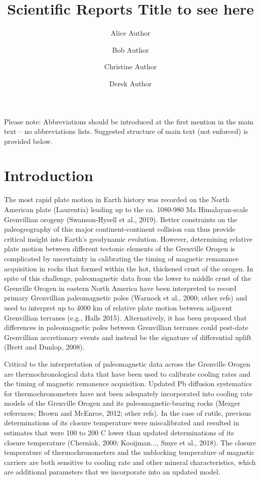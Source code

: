 \documentclass[fleqn,10pt]{wlscirep}
\title{Scientific Reports Title to see here}
\author[1,*]{Alice Author}
\author[2]{Bob Author}
\author[1,2,+]{Christine Author}
\author[2,+]{Derek Author}
\affil[1]{Affiliation, department, city, postcode, country}
\affil[2]{Affiliation, department, city, postcode, country}
\affil[*]{corresponding.author@email.example}
\affil[+]{these authors contributed equally to this work}
\begin{document}
\flushbottom
\maketitle
%
%
\thispagestyle{empty}

\noindent Please note: Abbreviations should be introduced at the first mention in the main text – no abbreviations lists. Suggested structure of main text (not enforced) is provided below.

\section*{Introduction}

The most rapid plate motion in Earth history was recorded on the North American plate (Laurentia) leading up to the ca. 1080-980 Ma Himalayan-scale Grenvillian orogeny (Swanson-Hysell et al., 2019). Better constraints on the paleogeography of this major continent-continent collision can thus provide critical insight into Earth's geodynamic evolution. However, determining relative plate motion between different tectonic elements of the Grenville Orogen  is complicated by uncertainty in calibrating the timing of magnetic remanance acquisition in rocks that formed within the hot, thickened crust of the orogen.
In spite of this challenge, paleomagnetic data from the lower to middle crust of the Grenville Orogen in eastern North America have been interpreted to record primary Grenvillian paleomagnetic poles (Warnock et al., 2000; other refs) and used to interpret up to 4000 km of relative plate motion between adjacent Grenvillian terranes (e.g., Halls 2015). Alternatively, it has been proposed that differences in paleomagnetic poles between Grenvillian terranes could post-date Grenvillian accretionary events and instead be the signature of differential uplift (Brett and Dunlop, 2008). 

Critical to the interpretation of paleomagnetic data across the Grenville Orogen are thermochronological data that have been used to calibrate cooling rates and the timing of magnetic remanence acquisition. Updated Pb diffusion systematics for thermochronometers have not been adequately incorporated into cooling rate models of the Grenville Orogen and its paleomagnetic-bearing rocks (Mezger references; Brown and McEnroe, 2012; other refs). In the case of rutile, previous determinations of its closure temperature were miscalibrated and resulted in estimates that were 100 to 200 \textdegree C lower than updated determinations of its closure temperature (Cherniak, 2000; Kooijman..., Smye et al., 2018). The closure temperature of thermochronometers and the unblocking temperature of magnetic carriers are both sensitive to cooling rate and other mineral characteristics, which are additional parameters that we incorporate into an updated model.
\end{document}
